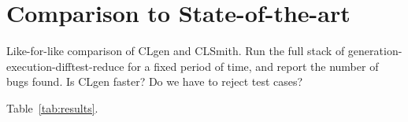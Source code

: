 \section{Comparison to State-of-the-art}

Like-for-like comparison of CLgen and CLSmith. Run the full stack of generation-execution-difftest-reduce for a fixed period of time, and report the number of bugs found. Is CLgen faster? Do we have to reject test cases?

Table~\ref{tab:results}.


